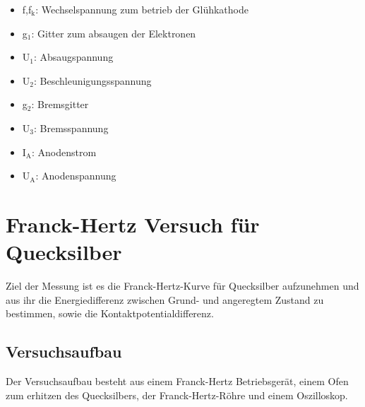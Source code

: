 \documentclass[12pt,a4paper]{article}
\begin{document}
\begin{itemize}
\item	f,f$_\text{k}$:		Wechselspannung	zum betrieb der Glühkathode

\item	g$_1$:				Gitter zum absaugen der Elektronen

\item	U$_1$:				Absaugspannung

\item	U$_2$:				Beschleunigungsspannung

\item	g$_2$:				Bremsgitter

\item	U$_3$:				Bremsspannung

\item	I$_\text{A}$:		Anodenstrom

\item	U$_\text{A}$:		Anodenspannung
\end{itemize}

\section{Franck-Hertz Versuch für Quecksilber}
Ziel der Messung ist es die Franck-Hertz-Kurve für Quecksilber aufzunehmen und aus ihr die Energiedifferenz zwischen Grund- und angeregtem Zustand zu bestimmen, sowie die Kontaktpotentialdifferenz.

\subsection{Versuchsaufbau}


Der Versuchsaufbau besteht aus einem Franck-Hertz Betriebsgerät, einem Ofen zum erhitzen des Quecksilbers, der Franck-Hertz-Röhre und einem Oszilloskop.
\end{document}
